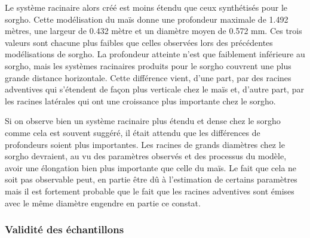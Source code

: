 Le système racinaire alors créé est moins étendu que ceux synthétisés pour le sorgho.
Cette modélisation du maïs donne une profondeur maximale de 1.492 mètres, une largeur de 0.432 mètre et un diamètre moyen de 0.572 mm.
Ces trois valeurs sont chacune plus faibles que celles observées lors des précédentes modélisations de sorgho.
La profondeur atteinte n'est que faiblement inférieure au sorgho, mais les systèmes racinaires produits pour le sorgho couvrent une plus grande distance horizontale.
Cette différence vient, d'une part, par des racines adventives qui s'étendent de façon plus verticale chez le maïs et, d'autre part, par les racines latérales qui ont une croissance plus importante chez le sorgho.
\newline

Si on observe bien un système racinaire plus étendu et dense chez le sorgho comme cela est souvent suggéré, il était attendu que les différences de profondeurs soient plus importantes.
Les racines de grands diamètres chez le sorgho devraient, au vu des paramètres observés et des processus du modèle, avoir une élongation bien plus importante que celle du maïs.
Le fait que cela ne soit pas observable peut, en partie être dû à l'estimation de certains paramètres mais il est fortement probable que le fait que les racines adventives sont émises avec le même diamètre engendre en partie ce constat.

\subsubsection{Validité des échantillons}

